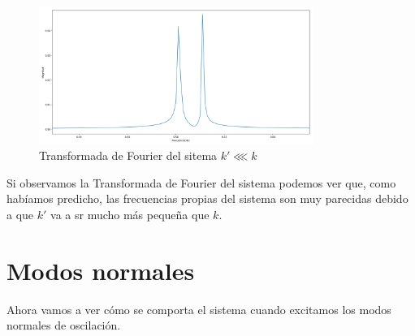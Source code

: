 \documentclass{article}
\begin{document}
\begin{figure}[H]
    \centering
    \includegraphics[width=0.8\textwidth]{fourier_k_mas_menor}
\caption{Transformada de Fourier del sitema $k'\lll k$}
\label{fig:f}
\end{figure}
Si observamos la Transformada de Fourier del sistema podemos ver que, como habíamos predicho, las frecuencias propias del sistema son muy parecidas debido a que $k'$ va a sr mucho más pequeña que $k$.
\section{Modos normales}
Ahora vamos a ver cómo se comporta el sistema cuando excitamos los modos normales de oscilación.
\end{document}
